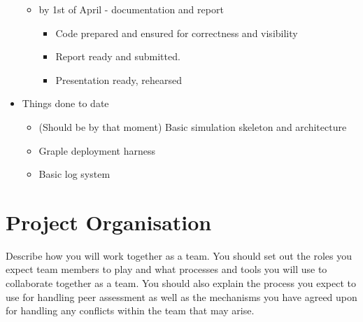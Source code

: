 \begin{itemize}
\begin{itemize}
	    \item by 1st of April - documentation and report
	    \begin{itemize}
	        \item Code prepared and ensured for correctness and visibility
	        \item Report ready and submitted.
	        \item Presentation ready, rehearsed
	    \end{itemize}

	\end{itemize}

	\item Things done to date
	\begin{itemize}
		\item (Should be by that moment) Basic simulation skeleton and architecture
		\item Graple deployment harness
		\item Basic log system
	\end{itemize}

\end{itemize}


\section{Project Organisation} %
Describe how you will work together as a team. You should set out the roles you expect team members to play and what
processes and tools you will use to collaborate together as a team. You should also explain the process you expect to
use for handling peer assessment as well as the mechanisms you have agreed upon for handling any conflicts within the
team that may arise.

